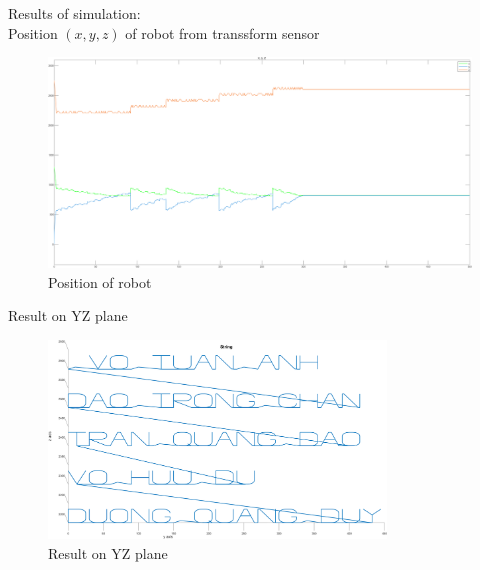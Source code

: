     Results of simulation: \\
    \hspace*{0.6cm}Position \( (x,y,z) \) of robot from transsform sensor
    \begin{figure}[H]
        \centering
        \includegraphics[width=1\textwidth]{pictures/xyz_pos_sensor.png}
        \caption{Position of robot}
        \label{fig:position}
    \end{figure}
    Result on YZ plane
    \begin{figure}[H]
        \centering
        \includegraphics[width=0.8\textwidth]{pictures/result_yz.png}
        \caption{Result on YZ plane}
        \label{fig:yz_plane}
    \end{figure}